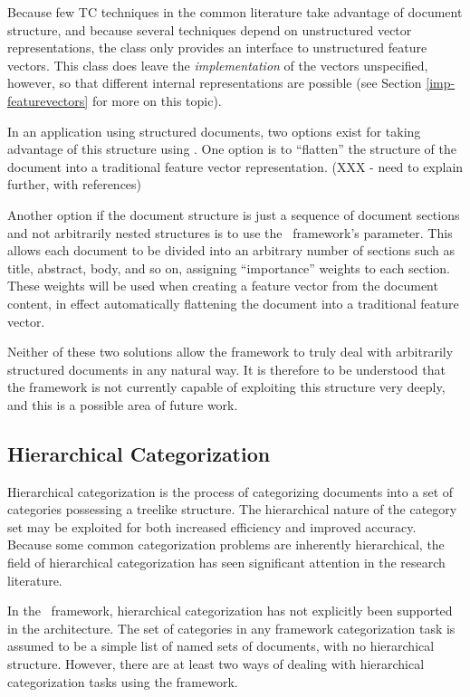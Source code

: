 Because few TC techniques in the common literature take advantage of
document structure, and because several techniques depend on
unstructured vector representations, the  class
only provides an interface to unstructured feature vectors.  This
class does leave the \emph{implementation} of the vectors unspecified,
however, so that different internal representations are possible (see
Section \ref{imp-featurevectors} for more on this topic).

In an application using structured documents, two options exist for
taking advantage of this structure using \aicat.  One option is to
``flatten'' the structure of the document into a traditional feature
vector representation. (XXX - need to explain further, with
references)  

Another option if the document structure is just a sequence of
document sections and not arbitrarily nested structures is to use the
\aicat\ framework's  parameter.  This allows
each document to be divided into an arbitrary number of sections such
as title, abstract, body, and so on, assigning ``importance'' weights
to each section.  These weights will be used when creating a feature
vector from the document content, in effect automatically flattening
the document into a traditional feature vector.

Neither of these two solutions allow the framework to truly deal with
arbitrarily structured documents in any natural way.  It is therefore
to be understood that the framework is not currently capable of
exploiting this structure very deeply, and this is a possible area of
future work.

\subsection{Hierarchical Categorization}

Hierarchical categorization is the process of categorizing documents
into a set of categories possessing a treelike structure.  The
hierarchical nature of the category set may be exploited for both
increased efficiency and improved accuracy.\cite{dumais:00}  Because
some common categorization problems are inherently hierarchical, the
field of hierarchical categorization has seen significant attention in
the research literature.\cite[p. 7]{sebastiani:02}

In the \aicat\ framework, hierarchical categorization has not
explicitly been supported in the architecture.  The set of categories
in any framework categorization task is assumed to be a simple list of
named sets of documents, with no hierarchical structure.  However,
there are at least two ways of dealing with hierarchical
categorization tasks using the framework.

